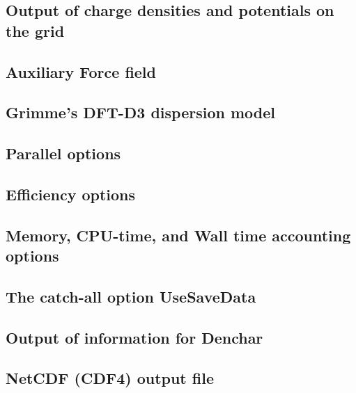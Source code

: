 

\subsection{Output of charge densities and potentials on the grid}



\subsection{Auxiliary Force field}



\subsection{Grimme's DFT-D3 dispersion model}
\label{DFT-D3}



\subsection{Parallel options}



\subsection{Efficiency options}



\subsection{Memory, CPU-time, and Wall time accounting options}



\subsection{The catch-all option UseSaveData}



\subsection{Output of information for Denchar}



\subsection{NetCDF (CDF4) output file}
\label{cdf-output}


